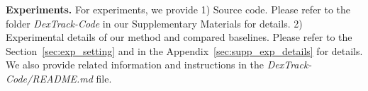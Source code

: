 

\noindent \textbf{Experiments.} 
For experiments, we provide 1) Source code.
Please refer to the folder \emph{DexTrack-Code} in our Supplementary Materials for details. 
2) Experimental details of our method and compared baselines. Please refer to the Section~\ref{sec:exp_setting} and in the Appendix~\ref{sec:supp_exp_details} for details. 
We also provide related information and instructions in the \emph{DexTrack-Code/README.md} file. 
